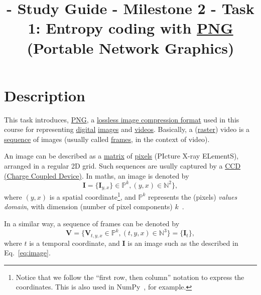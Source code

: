 


\title{\SM{} - Study Guide - Milestone 2 - Task 1: Entropy coding with
  \href{https://vicente-gonzalez-ruiz.github.io/PNG/}{PNG} (Portable
  Network Graphics)}

\maketitle

\tableofcontents

\section{Description}

This task introduces,
\href{https://vicente-gonzalez-ruiz.github.io/PNG/}{PNG}, a
\href{https://en.wikipedia.org/wiki/Lossless_compression}{lossless
  image compression format} used in this course for representing
\href{https://en.wikipedia.org/wiki/Digital_data}{digital}
\href{https://en.wikipedia.org/wiki/Digital_image}{images} and
\href{https://en.wikipedia.org/wiki/Video}{videos}. Basically, a
(\href{https://en.wikipedia.org/wiki/Raster_graphics}{raster}) video
is a \href{https://en.wikipedia.org/wiki/Sequence}{sequence} of images
(usually called
\href{https://en.wikipedia.org/wiki/Film_frame}{frames}, in the
context of video).

An image can be described as a
\href{https://en.wikipedia.org/wiki/Matrix_(mathematics)}{matrix} of
\href{https://en.wikipedia.org/wiki/Pixel}{pixels} (PIcture X-ray
ELementS), arranged in a regular 2D grid. Such sequences are
usully captured by a
\href{https://en.wikipedia.org/wiki/Charge-coupled_device}{CCD (Charge
  Coupled Device)}. In maths, an image is denoted by
\begin{equation}
  {\mathbf I} = \{{\mathbf I}_{y,x}\}\in\mathbb{P}^{k}, (y,x)\in\mathbb{N}^2\},
  \label{eq:image}
\end{equation}
where $(y,x)$ is a spatial coordinate\footnote{Notice that we follow
the ``first row, then column'' notation to express the
coordinates. This is also used in NumPy~\cite{harris2020array}, for
example.}, and $\mathbb{P}^{k}$ represents the (pixels) \emph{values
domain}, with dimension (number of pixel components)
$k$~\cite{burger2016digital}.

In a similar way, a sequence of frames can be denoted by
\begin{equation}
  {\mathbf V} = \{{\mathbf V}_{t,y,x}\in\mathbb{P}^{k}, (t,y,x)\in\mathbb{N}^3\} = \{{\mathbf I}_t\},
  \label{eq:video}
\end{equation}
where $t$ is a temporal coordinate, and ${\mathbf I}$ is an image such
as the described in Eq.~\eqref{eq:image}.

